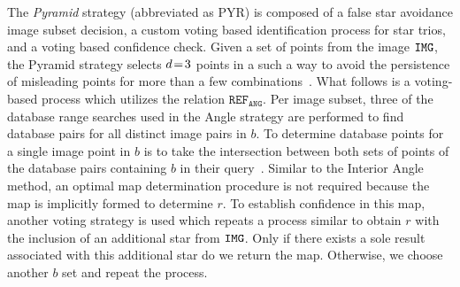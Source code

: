 
The \textit{Pyramid} strategy (abbreviated as PYR) is composed of a false star avoidance image subset decision, a custom voting based identification process for star trios, and a voting based confidence check. 
Given a set of points from the image $\texttt{IMG}$, the Pyramid strategy selects $d\!=\! 3$ points in a such a way to avoid the persistence of misleading points for more than a few combinations~\cite{mortari:pyramidIdentification}.
What follows is a voting-based process which utilizes the relation $\texttt{REF}_\texttt{ANG}$.
Per image subset, three of the database range searches used in the Angle strategy are performed to find database pairs for all distinct image pairs in $b$.
To determine database points for a single image point in $b$ is to take the intersection between both sets of points of the database pairs containing $b$ in their query~\cite{tichy:preliminaryTestsCommericalImagers}.
Similar to the Interior Angle method, an optimal map determination procedure is not required because the map is implicitly formed to determine $r$.
To establish confidence in this map, another voting strategy is used which repeats a process similar to obtain $r$ with the inclusion of an additional star from $\texttt{IMG}$.
Only if there exists a sole result associated with this additional star do we return the map.
Otherwise, we choose another $b$ set and repeat the process.


